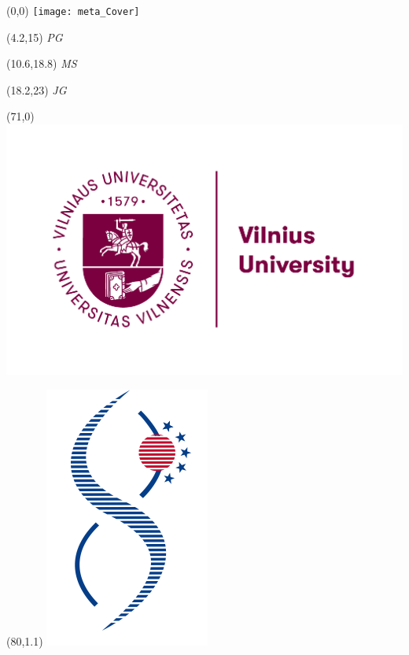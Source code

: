 \documentclass[a0,50pt]{a0poster}
\begin{document}
    \begin{textblock}{0}(0,0)
            \texttt{[image: meta\_Cover]}
    \end{textblock}

    \begin{textblock}{1}(4.2,15)
        \footnotesize\textit{PG}
    \end{textblock}
    \begin{textblock}{1}(10.6,18.8)
        \footnotesize\textit{MS}
    \end{textblock}
    \begin{textblock}{1}(18.2,23)
        \footnotesize\textit{JG}
    \end{textblock}


    \begin{textblock}{0}(71,0)
            \includegraphics[scale=1]{meta_logo_VU}
    \end{textblock}
    \begin{textblock}{0}(80,1.1)
            \includegraphics[scale=1.3]{meta_logo_BTI}
    \end{textblock}
\end{document}
